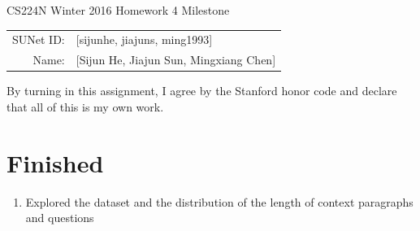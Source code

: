\documentclass[10pt]{article}
\begin{document}
\begin{center}
{\Large CS224N Winter 2016 Homework 4 Milestone}
\begin{tabular}{rl}
SUNet ID: & [sijunhe, jiajuns, ming1993] \\
Name: & [Sijun He, Jiajun Sun, Mingxiang Chen] \\
\end{tabular}
\end{center}

By turning in this assignment, I agree by the Stanford honor code and declare
that all of this is my own work.
\section*{Finished}
\begin{enumerate}[label=(\alph*)]
\item Explored the dataset and the distribution of the length of context paragraphs and questions
\begin{figure}[ht]
\centering
    \qquad

\end{figure}
\end{enumerate}
\end{document}
